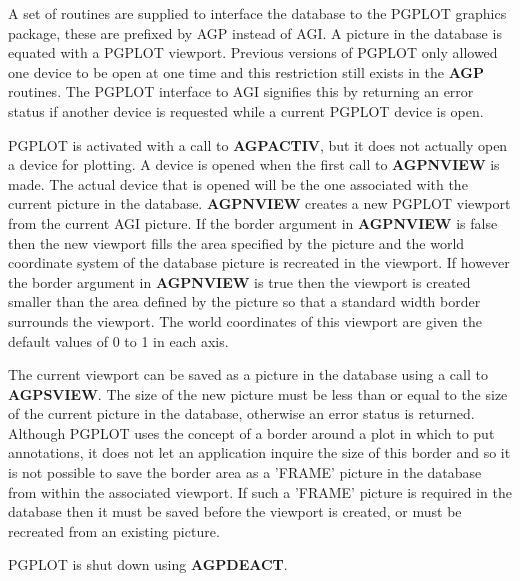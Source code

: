 \documentclass[twoside,11pt]{article}
\newcommand{\htmlref}[2]{#1}
\renewcommand{\_}{\texttt{\symbol{95}}}
\begin{document}
A set of routines are supplied to interface the database to the PGPLOT
graphics package, these are prefixed by AGP\_ instead of AGI\_. A
picture in the database is equated with a PGPLOT viewport. Previous
versions of PGPLOT only allowed one device to be open at one time and
this restriction still exists in the {\bf AGP\_} routines. The PGPLOT
interface to AGI signifies this by returning an error status if
another device is requested while a current PGPLOT device is open.

PGPLOT is activated with a call to 
\htmlref{{\bf AGP\_ACTIV}}{AGP_ACTIV}, but it does not
actually open a device for plotting.
A device is opened when the first call to 
\htmlref{{\bf AGP\_NVIEW}}{AGP_NVIEW} is made.
The actual device that is opened will be the one associated with the
current picture in the database.
{\bf AGP\_NVIEW} creates a new PGPLOT viewport from the current AGI
picture.
If the border argument in {\bf AGP\_NVIEW} is false then the
new viewport fills the area specified by the picture and the world
coordinate system of the database picture is recreated in the viewport.
If however the border argument in {\bf AGP\_NVIEW} is true then
the viewport is created smaller than the area defined by the picture so
that a standard width border surrounds the viewport. The world coordinates
of this viewport are given the default values of 0 to 1 in each axis.

The current viewport can be saved as a picture in the database using a
call to \htmlref{{\bf AGP\_SVIEW}}{AGP_SVIEW}.
The size of the new picture must be less than
or equal to the size of the current picture in the database, otherwise
an error status is returned.
Although PGPLOT uses the concept of a border around a plot in which to
put annotations, it does not let an application inquire the size of this
border and so it is not possible to save the border area as a 'FRAME'
picture in the database from within the associated viewport. If such a
'FRAME' picture is required in the database then it must be saved before
the viewport is created, or must be recreated from an existing picture.

PGPLOT is shut down using \htmlref{{\bf AGP\_DEACT}}{AGP_DEACT}.
\end{document}
